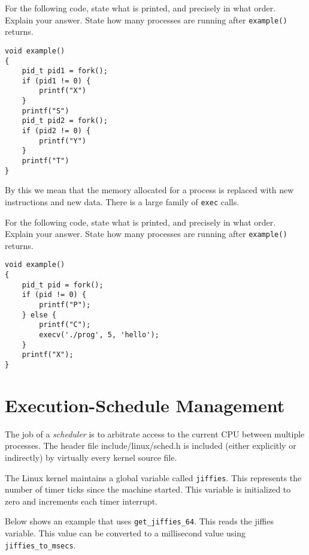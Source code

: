 \begin{example}
For the following code, state what is printed, and precisely in what order.
Explain your answer. State how many processes are running 
after \lstinline{example()} returns.
\begin{lstlisting}
void example()
{
	pid_t pid1 = fork();
	if (pid1 != 0) {
		printf("X")
	}
	printf("S")
	pid_t pid2 = fork();
	if (pid2 != 0) {
		printf("Y")
	}
	printf("T")
}
\end{lstlisting}
\end{example}



By this we mean that the memory allocated for a process is replaced with new 
instructions and new data. There is a large family of \lstinline{exec} calls.

\frmrule

\begin{example}
For the following code, state what is printed, and precisely in what order.
Explain your answer. State how many processes are running 
after \lstinline{example()} returns.

\begin{lstlisting}
void example()
{
	pid_t pid = fork();
	if (pid != 0) {
		printf("P");
	} else {
		printf("C");
		execv('./prog', 5, 'hello');
	}       
	printf("X");
}
\end{lstlisting}
\end{example}



\section{Execution-Schedule Management}

The job of a \textit{scheduler} is to arbitrate access to the 
current CPU between multiple processes.
The header file include/linux/sched.h is included (either explicitly or indirectly) by
virtually every kernel source file.

The Linux kernel maintains a global variable called \lstinline{jiffies}. 
This represents the number of timer ticks since the machine started. 
This variable is initialized to zero and increments each timer interrupt.

Below shows an example that uses \lstinline{get_jiffies_64}. This reads the jiffies 
variable. This value can be converted to a millisecond value using 
\lstinline{jiffies_to_msecs}.





